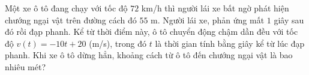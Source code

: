 \begin{bt}%
	Một xe ô tô đang chạy với tốc độ $72$ km/h thì người lái xe bất ngờ phát hiện chướng ngại vật trên đường cách đó $55$ m. Người lái xe, phản ứng mất $1$ giây sau đó rồi đạp phanh. Kể từ thời điểm này, ô tô chuyển  động chậm dần đều với tốc độ $v(t)=-10 t+20$ (m/s), trong đó $t$ là thời gian tính bằng giây kể từ lúc đạp phanh. Khi xe ô tô dừng hẳn, khoảng cách từ ô tô đến chướng ngại vật là bao nhiêu mét?
\end{bt}

